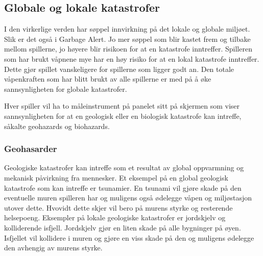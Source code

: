 
\subsection{Globale og lokale katastrofer}\label{sec:hazards}

I den virkerlige verden har søppel innvirkning på det lokale og globale miljøet. Slik er det også i Garbage Alert. Jo mer søppel som blir kastet frem og tilbake mellom spillerne, jo høyere blir risikoen for at en katastrofe inntreffer. Spilleren som har brukt våpnene mye har en høy risiko for at en lokal katastrofe inntreffer. Dette gjør spillet vanskeligere for spillerne som ligger godt an. Den totale våpenkraften som har blitt brukt av alle spillerne er med på å øke sannsynligheten for globale katastrofer.

Hver spiller vil ha to måleinstrument på panelet sitt på skjermen som viser sannsynligheten for at en geologisk eller en biologisk katastrofe kan intreffe, såkalte geohazards og biohazards.

\subsubsection{Geohasarder}
Geologiske katastrofer kan intreffe som et resultat av global oppvarmning og mekanisk påvirkning fra mennesker.
Et eksempel på en global geologisk katastrofe som kan intreffe er tsunamier. En tsunami vil gjøre skade på den eventuelle muren spilleren har og muligens også ødelegge våpen og miljøstasjon utover dette. Hvovidt dette skjer vil bero på murens styrke og resterende helsepoeng.
Eksempler på lokale geologiske katastrofer er jordskjelv og kolliderende isfjell. Jordskjelv gjør en liten skade på alle bygninger på øyen. Isfjellet vil kollidere i muren og gjøre en viss skade på den og muligens ødelegge den avhengig av murens styrke. 


